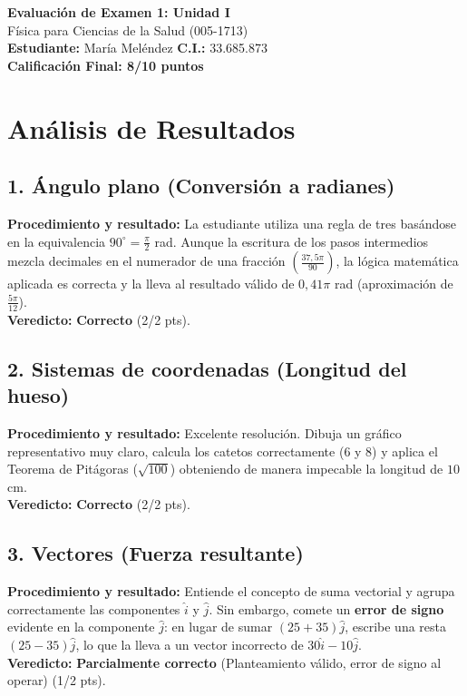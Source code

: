 \documentclass[12pt]{article}
\begin{document}
\begin{center}
    \Large \textbf{Evaluación de Examen 1: Unidad I} \\
    \large Física para Ciencias de la Salud (005-1713) \\
    \vspace{0.5cm}
    \textbf{Estudiante:} María Meléndez \quad \textbf{C.I.:} 33.685.873
    \vspace{0.3cm} \\
    \large \textbf{Calificación Final: 8/10 puntos}
\end{center}

\vspace{0.5cm}

\section*{Análisis de Resultados}

\subsection*{1. Ángulo plano (Conversión a radianes)}
\textbf{Procedimiento y resultado:} La estudiante utiliza una regla de tres basándose en la equivalencia $90^\circ = \frac{\pi}{2}$ rad. Aunque la escritura de los pasos intermedios mezcla decimales en el numerador de una fracción $\left(\frac{37,5\pi}{90}\right)$, la lógica matemática aplicada es correcta y la lleva al resultado válido de $0,41\pi$ rad (aproximación de $\frac{5\pi}{12}$). \\
\textbf{Veredicto:} \textbf{Correcto} (2/2 pts).

\subsection*{2. Sistemas de coordenadas (Longitud del hueso)}
\textbf{Procedimiento y resultado:} Excelente resolución. Dibuja un gráfico representativo muy claro, calcula los catetos correctamente ($6$ y $8$) y aplica el Teorema de Pitágoras ($\sqrt{100}$) obteniendo de manera impecable la longitud de $10$ cm. \\
\textbf{Veredicto:} \textbf{Correcto} (2/2 pts).

\subsection*{3. Vectores (Fuerza resultante)}
\textbf{Procedimiento y resultado:} Entiende el concepto de suma vectorial y agrupa correctamente las componentes $\hat{i}$ y $\hat{j}$. Sin embargo, comete un \textbf{error de signo} evidente en la componente $\hat{j}$: en lugar de sumar $(25 + 35)\hat{j}$, escribe una resta $(25 - 35)\hat{j}$, lo que la lleva a un vector incorrecto de $30\hat{i} - 10\hat{j}$. \\
\textbf{Veredicto:} \textbf{Parcialmente correcto} (Planteamiento válido, error de signo al operar) (1/2 pts).
\end{document}
